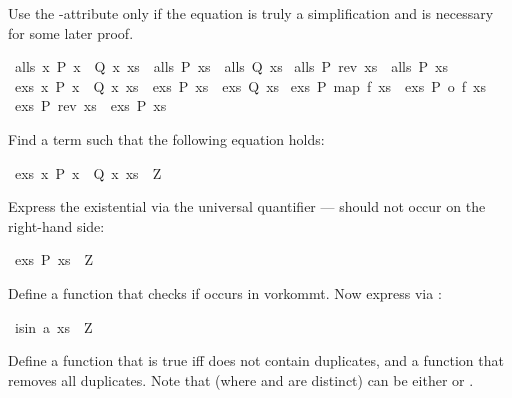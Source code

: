 \begin{isabellebody}
\begin{isamarkuptext}
Use the -attribute only if the equation is truly a
simplification and is necessary for some later proof.%
\end{isamarkuptext}%
\isamarkuptrue%
\ {\isachardoublequote}alls\ {\isacharparenleft}{\isasymlambda}x{\isachardot}\ P\ x\ {\isasymand}\ Q\ x{\isacharparenright}\ xs\ {\isacharequal}\ {\isacharparenleft}alls\ P\ xs\ {\isasymand}\ alls\ Q\ xs{\isacharparenright}{\isachardoublequote}\isamarkupfalse%
\isanewline
\isamarkupfalse%
\ {\isachardoublequote}alls\ P\ {\isacharparenleft}rev\ xs{\isacharparenright}\ {\isacharequal}\ alls\ P\ xs{\isachardoublequote}\isamarkupfalse%
\isanewline
\isamarkupfalse%
\ {\isachardoublequote}exs\ {\isacharparenleft}{\isasymlambda}x{\isachardot}\ P\ x\ {\isasymand}\ Q\ x{\isacharparenright}\ xs\ {\isacharequal}\ {\isacharparenleft}exs\ P\ xs\ {\isasymand}\ exs\ Q\ xs{\isacharparenright}{\isachardoublequote}\isamarkupfalse%
\isanewline
\isamarkupfalse%
\ {\isachardoublequote}exs\ P\ {\isacharparenleft}map\ f\ xs{\isacharparenright}\ {\isacharequal}\ exs\ {\isacharparenleft}P\ o\ f{\isacharparenright}\ xs{\isachardoublequote}\isamarkupfalse%
\isanewline
\isamarkupfalse%
\ {\isachardoublequote}exs\ P\ {\isacharparenleft}rev\ xs{\isacharparenright}\ {\isacharequal}\ exs\ P\ xs{\isachardoublequote}\isamarkupfalse%
\isamarkupfalse%
%
\begin{isamarkuptext}%
Find a term  such that the following equation holds:%
\end{isamarkuptext}%
\isamarkuptrue%
\ {\isachardoublequote}exs\ {\isacharparenleft}{\isasymlambda}x{\isachardot}\ P\ x\ {\isasymor}\ Q\ x{\isacharparenright}\ xs\ {\isacharequal}\ Z{\isachardoublequote}\isamarkupfalse%
\isamarkupfalse%
%
\begin{isamarkuptext}%
Express the existential via the universal quantifier ---
 should not occur on the right-hand side:%
\end{isamarkuptext}%
\isamarkuptrue%
\ {\isachardoublequote}exs\ P\ xs\ {\isacharequal}\ Z{\isachardoublequote}\isamarkupfalse%
\isamarkupfalse%
%
\begin{isamarkuptext}%
Define a function  that checks if  occurs in
 vorkommt. Now express  via :%
\end{isamarkuptext}%
\isamarkuptrue%
\ {\isachardoublequote}is{\isacharunderscore}in\ a\ xs\ {\isacharequal}\ Z{\isachardoublequote}\isamarkupfalse%
\isamarkupfalse%
%
\begin{isamarkuptext}%
Define a function  that is true iff
 does not contain duplicates, and a function  that removes all duplicates. Note that 
(where  and  are distinct) can be either
 or .


\end{isamarkuptext}
\end{isabellebody}
